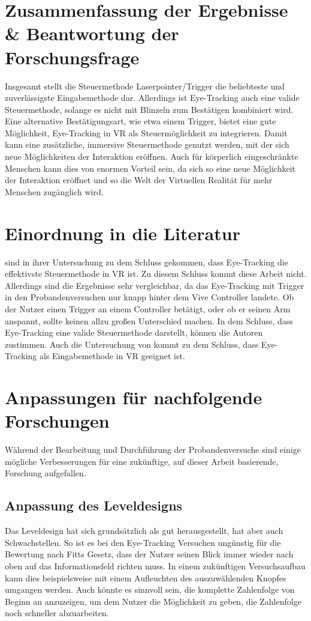\section{Zusammenfassung der Ergebnisse \& Beantwortung der Forschungsfrage}
Insgesamt stellt die Steuermethode Laserpointer/Trigger die beliebteste und zuverlässigste Eingabemethode dar. Allerdings ist Eye-Tracking auch eine valide Steuermethode, solange es nicht mit Blinzeln zum Bestätigen kombiniert wird. Eine alternative Bestätigungsart, wie etwa einem Trigger, bietet eine gute Möglichkeit, Eye-Tracking in VR als Steuermöglichkeit zu integrieren. Damit kann eine zusätzliche, immersive Steuermethode genutzt werden, mit der sich neue Möglichkeiten der Interaktion eröffnen. Auch für körperlich eingeschränkte Menschen kann dies von enormen Vorteil sein, da sich so eine neue Möglichkeit der Interaktion eröffnet und so die Welt der Virtuellen Realität für mehr Menschen zugänglich wird. 

\section{Einordnung in die Literatur}
\citeauthor{Pai.2019} sind in ihrer Untersuchung zu dem Schluss gekommen, dass Eye-Tracking die effektivste Steuermethode in VR ist. Zu diesem Schluss kommt diese Arbeit nicht. Allerdings sind die Ergebnisse sehr vergleichbar, da das Eye-Tracking mit Trigger in den Probandenversuchen nur knapp hinter dem Vive Controller landete. Ob der Nutzer einen Trigger an einem Controller betätigt, oder ob er seinen Arm anspannt, sollte keinen allzu großen Unterschied machen. In dem Schluss, dass Eye-Tracking eine valide Steuermethode darstellt, können die Autoren \citeauthor{Pai.2019} zustimmen. Auch die Untersuchung von \citeauthor{D.Kumar.2016} kommt zu dem Schluss, dass Eye-Tracking als Eingabemethode in VR geeignet ist. 

\section{Anpassungen für nachfolgende Forschungen}
Während der Bearbeitung und Durchführung der Probandenversuche sind einige mögliche Verbesserungen für eine zukünftige, auf dieser Arbeit basierende, Forschung aufgefallen.
\subsection{Anpassung des Leveldesigns}
Das Leveldesign hat sich grundsätzlich als gut herausgestellt, hat aber auch Schwachstellen. So ist es bei den Eye-Tracking Versuchen ungünstig für die Bewertung nach Fitts Gesetz, dass der Nutzer seinen Blick immer wieder nach oben auf das Informationsfeld richten muss. In einem zukünftigen Versuchsaufbau kann dies beispielsweise mit einem Aufleuchten des auszuwählenden Knopfes umgangen werden. Auch könnte es sinnvoll sein, die komplette Zahlenfolge von Beginn an anzuzeigen, um dem Nutzer die Möglichkeit zu geben, die Zahlenfolge noch schneller abzuarbeiten. 
